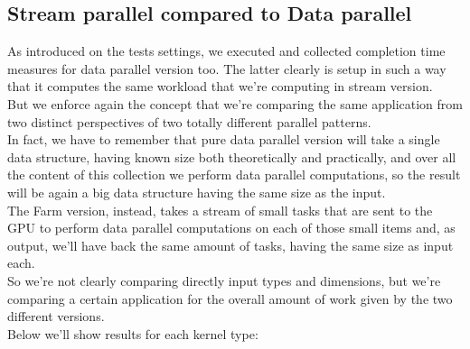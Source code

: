 \subsection{Stream parallel compared to Data parallel}
As introduced on the tests settings, we executed and collected completion time measures for data parallel version too.
The latter clearly is setup in such a way that it computes the same workload that we're computing in stream version.\\
But we enforce again the concept that we're comparing the same application from two distinct perspectives of two totally different parallel patterns.\\
In fact, we have to remember that pure data parallel version will take a single data structure, having known size both theoretically and practically, and over all the content of this collection we perform data parallel computations, so the result will be again a big data structure having the same size as the input.\\
The Farm version, instead, takes a stream of small tasks that are sent to the GPU to perform data parallel computations on each of those small items and, as output, we'll have back the same amount of tasks, having the same size as input each.\\
So we're not clearly comparing directly input types and dimensions, but we're comparing a certain application for the overall amount of work given by the two different versions.\\
Below we'll show results for each kernel type:
